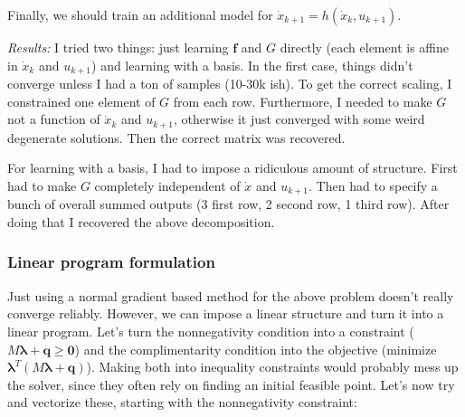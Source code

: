 \documentclass{article}
\renewcommand{\vec}[1]{\boldsymbol{#1}}
\begin{document}
Finally, we should train an additional model for $\dot x_{k+1} = h(\dot x_k, u_{k+1})$.

\textit{Results: } I tried two things: just learning $\vec{f}$ and $G$ directly (each element is affine in $\dot x_k$ and $u_{k+1}$) and learning with a basis. In the first case, things didn't converge unless I had a ton of samples (10-30k ish). To get the correct scaling, I constrained one element of $G$ from each row. Furthermore, I needed to make $G$ not a function of $\dot x_k$ and $u_{k+1}$, otherwise it just converged with some weird degenerate solutions. Then the correct matrix was recovered.

For learning with a basis, I had to impose a ridiculous amount of structure. First had to make $G$ completely independent of $\dot x$ and $u_{k+1}$. Then had to specify a bunch of overall summed outputs (3 first row, 2 second row, 1 third row). After doing that I recovered the above decomposition.

\subsubsection{Linear program formulation}
Just using a normal gradient based method for the above problem doesn't really converge reliably. However, we can impose a linear structure and turn it into a linear program. Let's turn the nonnegativity condition into a constraint ($M \vec{\lambda} + \vec{q} \geq \vec{0}$) and the complimentarity condition into the objective (minimize $\vec{\lambda}^T (M \vec{\lambda} + \vec{q})$). Making both into inequality constraints would probably mess up the solver, since they often rely on finding an initial feasible point. Let's now try and vectorize these, starting with the nonnegativity constraint:
\end{document}
